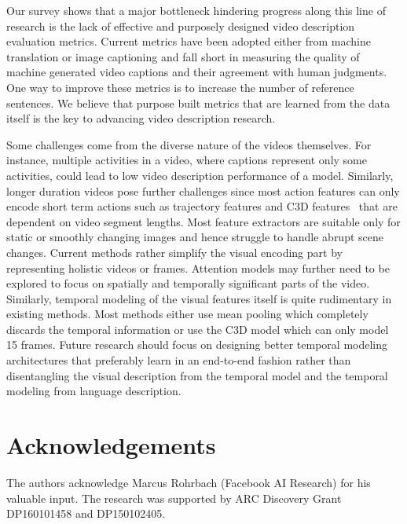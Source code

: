 \documentclass[10pt,journal,compsoc]{IEEEtran}
\begin{document}
Our survey shows that a major bottleneck hindering progress along this line of research is the lack of effective and purposely designed video description evaluation metrics. Current metrics have been adopted either from machine translation or image captioning and fall short in measuring the quality of machine generated video captions and their agreement with human judgments. One way to improve these metrics is to increase the number of reference sentences. We believe that purpose built metrics that are learned from the data itself is the key to advancing video description research.

Some challenges come from the diverse nature of the videos themselves. For instance, multiple activities in a video, where captions represent only some activities, could lead to low video description performance of a model. Similarly, longer duration videos pose further challenges since most action features can only encode short term actions such as trajectory features and C3D features~\cite{c3dgenericfeatures} that are dependent on video segment lengths. Most feature extractors are suitable only for static or smoothly changing images and hence struggle to handle abrupt scene changes. Current methods rather simplify the visual encoding part by representing holistic videos or frames. Attention models may further need to be explored to focus on spatially and temporally significant parts of the video. Similarly, temporal modeling of the visual features itself is quite rudimentary in existing methods. Most methods either use mean pooling which completely discards the temporal information or use the C3D model which can only model 15 frames. Future research should focus on designing better temporal modeling architectures that preferably learn in an end-to-end fashion rather than disentangling the visual description from the temporal model and the temporal modeling from language description.

\vspace{-4mm}
\section*{Acknowledgements}
\vspace{-2mm}
The authors acknowledge Marcus Rohrbach (Facebook AI Research) for his valuable input. The research was supported by ARC Discovery Grant DP160101458 and DP150102405.

\end{document}
